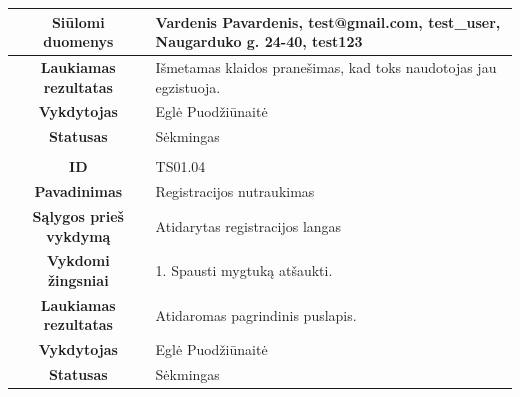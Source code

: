 \documentclass{VUMIFPSkursinis}
\begin{document}
	\begin{table}[H]
			\begin{tabular}{|p{6cm}|p{11cm}|}
			\hline
			\multicolumn{1}{|c|}{{\bfseries Siūlomi duomenys}}&
			{Vardenis Pavardenis, test@gmail.com, test\_user, Naugarduko g. 24-40, test123}\\
			\hline
			\multicolumn{1}{|c|}{{\bfseries Laukiamas rezultatas}}&
			{Išmetamas klaidos pranešimas, kad toks naudotojas jau egzistuoja.}\\
			\hline
			\multicolumn{1}{|c|}{{\bfseries Vykdytojas}}&
			{Eglė Puodžiūnaitė}\\
			\hline
			\multicolumn{1}{|c|}{{\bfseries Statusas}}&
			{Sėkmingas}\\
			\rowcolor{lightgray}
			\multicolumn{2}{|c|}{}\\
			\hline
			\multicolumn{1}{|c|}{{\bfseries ID}}&
			{TS01.04}\\
			\hline
			\multicolumn{1}{|c|}{{\bfseries Pavadinimas}}&
			{Registracijos nutraukimas}\\
			\hline
			\multicolumn{1}{|c|}{{\bfseries Sąlygos prieš vykdymą}}&
			{Atidarytas registracijos langas}\\
			\hline
			\multicolumn{1}{|c|}{{\bfseries Vykdomi žingsniai}}&
			{1. Spausti mygtuką atšaukti.}\\
			\hline
			\multicolumn{1}{|c|}{{\bfseries Laukiamas rezultatas}}&
			{Atidaromas pagrindinis puslapis.}\\
			\hline
			\multicolumn{1}{|c|}{{\bfseries Vykdytojas}}&
			{Eglė Puodžiūnaitė}\\
			\hline
			\multicolumn{1}{|c|}{{\bfseries Statusas}}&
			{Sėkmingas}\\
			\hline
		\end{tabular}
	\end{table}
\end{document}
